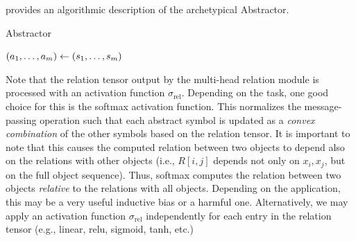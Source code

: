  provides an algorithmic description of the archetypical Abstractor.

\begin{algorithm}[ht!]
	\caption{Abstractor}\label{alg:abstractor}

	\vspace{1em}

	\((a_1, \ldots, a_m) \gets (s_1, \ldots, s_m)\)

\end{algorithm}

Note that the relation tensor output by the multi-head relation module is processed with an activation function $\sigma_{\mathrm{rel}}$. Depending on the task, one good choice for this is the softmax activation function. This normalizes the message-passing operation such that each abstract symbol is updated as a \textit{convex combination} of the other symbols based on the relation tensor. It is important to note that this causes the computed relation between two objects to depend also on the relations with other objects (i.e., $R[i,j]$ depends not only on $x_i, x_j$, but on the full object sequence). Thus, softmax computes the relation between two objects \textit{relative} to the relations with all objects. Depending on the application, this may be a very useful inductive bias or a harmful one. Alternatively, we may apply an activation function $\sigma_{\mathrm{rel}}$ independently for each entry in the relation tensor (e.g., linear, relu, sigmoid, tanh, etc.)

